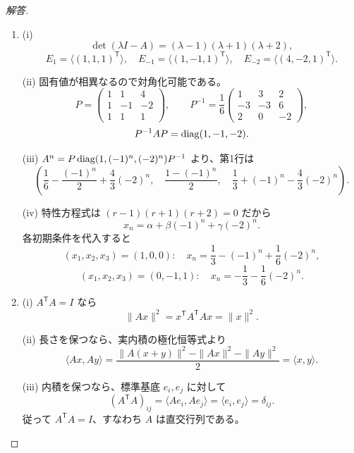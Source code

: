 \begin{proof}[解答]
\begin{enumerate}
  \item[(1)] (i)
  \[
  \det(\lambda I-A)=(\lambda-1)(\lambda+1)(\lambda+2),
  \]
  \[
  E_1=\langle(1,1,1)^{\mathsf T}\rangle,\quad
  E_{-1}=\langle(1,-1,1)^{\mathsf T}\rangle,\quad
  E_{-2}=\langle(4,-2,1)^{\mathsf T}\rangle.
  \]

  (ii) 固有値が相異なるので対角化可能である。
  \[
  P=\begin{pmatrix}1&1&4\\1&-1&-2\\1&1&1\end{pmatrix},\qquad
  P^{-1}=\frac16\begin{pmatrix}1&3&2\\-3&-3&6\\2&0&-2\end{pmatrix},
  \]
  \[
  P^{-1}AP=\operatorname{diag}(1,-1,-2).
  \]

  (iii) $A^n=P\operatorname{diag}(1,(-1)^n,(-2)^n)P^{-1}$ より、第1行は
  \[
  \left(
  \frac16-\frac{(-1)^n}{2}+\frac43(-2)^n,\quad
  \frac{1-(-1)^n}{2},\quad
  \frac13+(-1)^n-\frac43(-2)^n
  \right).
  \]

  (iv) 特性方程式は $(r-1)(r+1)(r+2)=0$ だから
  \[
  x_n=\alpha+\beta(-1)^n+\gamma(-2)^n.
  \]
  各初期条件を代入すると
  \[
  (x_1,x_2,x_3)=(1,0,0):
  \quad x_n=\frac13-(-1)^n+\frac16(-2)^n,
  \]
  \[
  (x_1,x_2,x_3)=(0,-1,1):
  \quad x_n=-\frac13-\frac16(-2)^n.
  \]

  \item[(2)] (i) $A^{\mathsf T}A=I$ なら
  \[
  \|Ax\|^2=x^{\mathsf T}A^{\mathsf T}Ax=\|x\|^2.
  \]

  (ii) 長さを保つなら、実内積の極化恒等式より
  \[
  \langle Ax,Ay\rangle
  =\frac{\|A(x+y)\|^2-\|Ax\|^2-\|Ay\|^2}{2}
  =\langle x,y\rangle.
  \]

  (iii) 内積を保つなら、標準基底 $e_i,e_j$ に対して
  \[
  (A^{\mathsf T}A)_{ij}
  =\langle Ae_i,Ae_j\rangle
  =\langle e_i,e_j\rangle=\delta_{ij}.
  \]
  従って $A^{\mathsf T}A=I$、すなわち $A$ は直交行列である。
\end{enumerate}
\end{proof}

